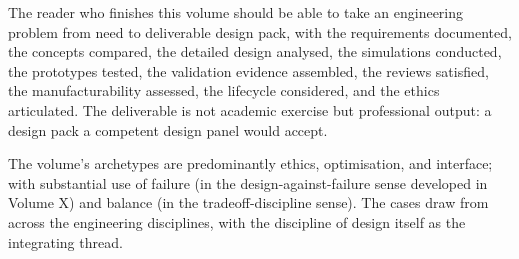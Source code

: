 The reader who finishes this volume should be able to take an engineering problem from need to deliverable design pack, with the requirements documented, the concepts compared, the detailed design analysed, the simulations conducted, the prototypes tested, the validation evidence assembled, the reviews satisfied, the manufacturability assessed, the lifecycle considered, and the ethics articulated. The deliverable is not academic exercise but professional output: a design pack a competent design panel would accept.

The volume's archetypes are predominantly ethics, optimisation, and interface; with substantial use of failure (in the design-against-failure sense developed in Volume X) and balance (in the tradeoff-discipline sense). The cases draw from across the engineering disciplines, with the discipline of design itself as the integrating thread.

\vspace{1cm}

